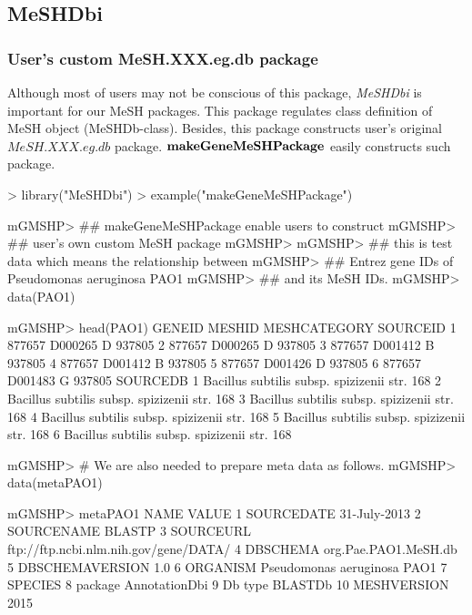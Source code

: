 \documentclass[11pt]{article}
\newcommand{\Rpackage}[1]{{\textit{#1}}}
\begin{document}
\clearpage
\subsection{MeSHDbi}
\subsubsection{User's custom MeSH.XXX.eg.db package}
Although most of users may not be conscious of this package, \Rpackage{MeSHDbi} is important for our MeSH packages. This package regulates class definition of MeSH object (MeSHDb-class). Besides, this package constructs user's original $MeSH.XXX.eg.db$ package. $\bf{makeGeneMeSHPackage}$ easily constructs such package.

\begin{center}
\begin{Schunk}
\begin{Sinput}
> library("MeSHDbi")
> example("makeGeneMeSHPackage")
\end{Sinput}
\begin{Soutput}
mGMSHP> ## makeGeneMeSHPackage enable users to construct
mGMSHP> ## user's own custom MeSH package
mGMSHP> 
mGMSHP> ## this is test data which means the relationship between
mGMSHP> ## Entrez gene IDs of Pseudomonas aeruginosa PAO1
mGMSHP> ## and its MeSH IDs.
mGMSHP> data(PAO1)

mGMSHP> head(PAO1)
  GENEID  MESHID MESHCATEGORY SOURCEID
1 877657 D000265            D   937805
2 877657 D000265            D   937805
3 877657 D001412            B   937805
4 877657 D001412            B   937805
5 877657 D001426            D   937805
6 877657 D001483            G   937805
                                      SOURCEDB
1 Bacillus subtilis subsp. spizizenii str. 168
2 Bacillus subtilis subsp. spizizenii str. 168
3 Bacillus subtilis subsp. spizizenii str. 168
4 Bacillus subtilis subsp. spizizenii str. 168
5 Bacillus subtilis subsp. spizizenii str. 168
6 Bacillus subtilis subsp. spizizenii str. 168

mGMSHP> # We are also needed to prepare meta data as follows.
mGMSHP> data(metaPAO1)

mGMSHP> metaPAO1
              NAME                                 VALUE
1       SOURCEDATE                          31-July-2013
2       SOURCENAME                                BLASTP
3        SOURCEURL ftp://ftp.ncbi.nlm.nih.gov/gene/DATA/
4         DBSCHEMA                  org.Pae.PAO1.MeSH.db
5  DBSCHEMAVERSION                                   1.0
6         ORGANISM           Pseudomonas aeruginosa PAO1
7          SPECIES                                      
8          package                         AnnotationDbi
9          Db type                               BLASTDb
10     MESHVERSION                                  2015


\end{Soutput}
\end{Schunk}
\end{center}
\end{document}
